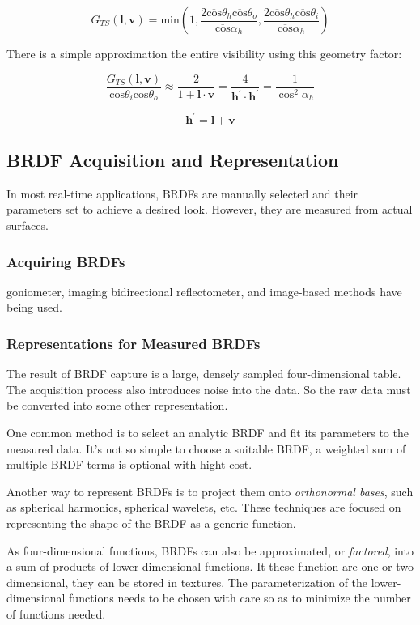\documentclass[10pt, a4paper]{article}
\begin{document}
        $$G_{TS}(\textbf{l}, \textbf{v}) = \text{min}(1, \frac{2\overline{\text{cos}}\theta_h\overline{\text{cos}}\theta_o}{\overline{\text{cos}}\alpha_h}, \frac{2\overline{\text{cos}}\theta_h\overline{\text{cos}}\theta_i}{\overline{\text{cos}}\alpha_h})$$

        There is a simple approximation the entire visibility using this geometry factor: 

        $$\frac{G_{TS}(\textbf{l}, \textbf{v})}{\overline{\text{cos}}\theta_i\overline{\text{cos}}\theta_o} \approx \frac{2}{1 + \textbf{l}\cdot\textbf{v}} = \frac{4}{\textbf{h}^{'}\cdot\textbf{h}^{'}} = \frac{1}{\cos^2{\alpha_h}}$$

        $$\textbf{h}^{'} = \textbf{l} + \textbf{v}$$

    \subsection{BRDF Acquisition and Representation}
        In most real-time applications, BRDFs are manually selected and their parameters set to achieve a desired look. However, they are measured from actual surfaces. 
        \subsubsection{Acquiring BRDFs}
            goniometer, imaging bidirectional reflectometer, and image-based methods have being used.
        \subsubsection{Representations for Measured BRDFs}
            The result of BRDF capture is a large, densely sampled four-dimensional table. The acquisition process also introduces noise into the data. So the raw data must be converted into some other representation. 

            One common method is to select an analytic BRDF and fit its parameters to the measured data. It's not so simple to choose a suitable BRDF, a weighted sum of multiple BRDF terms is optional with hight cost. 

            Another way to represent BRDFs is to project them onto \emph{orthonormal bases}, such as spherical harmonics, spherical wavelets, etc. These techniques are focused on representing the shape of the BRDF as a generic function. 

            As four-dimensional functions, BRDFs can also be approximated, or \emph{factored}, into a sum of products of lower-dimensional functions. It these function are one or two dimensional, they can be stored in textures. The parameterization of the lower-dimensional functions needs to be chosen with care so as to minimize the number of functions needed. 
\end{document}
